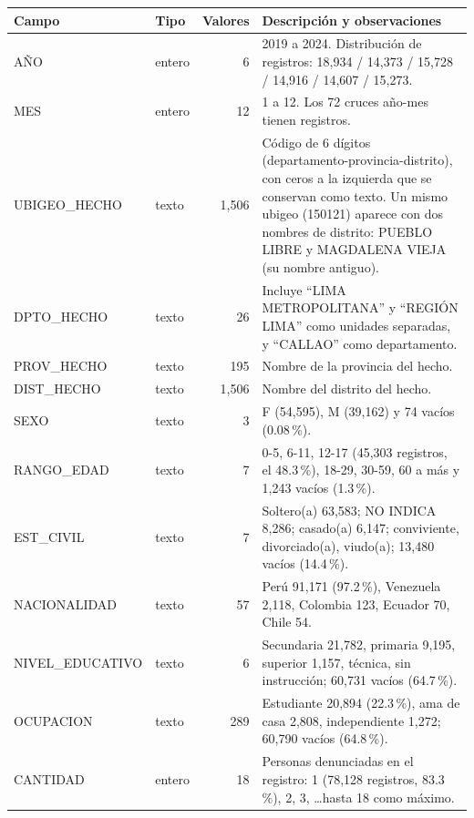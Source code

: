 \begin{center}
\small
\begin{tabular}{llrp{6.6cm}}
\toprule
\textbf{Campo} & \textbf{Tipo} & \textbf{Valores} & \textbf{Descripci\'on y observaciones}\\
\midrule
A\~NO & entero & 6 & 2019 a 2024. Distribuci\'on de registros: 18,934 / 14,373 / 15,728 / 14,916 / 14,607 / 15,273.\\
MES & entero & 12 & 1 a 12. Los 72 cruces a\~no-mes tienen registros.\\
UBIGEO\_HECHO & texto & 1,506 & C\'odigo de 6 d\'igitos (departamento-provincia-distrito), con ceros a la izquierda que se conservan como texto. Un mismo ubigeo (150121) aparece con dos nombres de distrito: PUEBLO LIBRE y MAGDALENA VIEJA (su nombre antiguo).\\
DPTO\_HECHO & texto & 26 & Incluye ``LIMA METROPOLITANA'' y ``REGI\'ON LIMA'' como unidades separadas, y ``CALLAO'' como departamento.\\
PROV\_HECHO & texto & 195 & Nombre de la provincia del hecho.\\
DIST\_HECHO & texto & 1,506 & Nombre del distrito del hecho.\\
SEXO & texto & 3 & F (54,595), M (39,162) y 74 vac\'ios (0.08\,\%).\\
RANGO\_EDAD & texto & 7 & 0-5, 6-11, 12-17 (45,303 registros, el 48.3\,\%), 18-29, 30-59, 60 a m\'as y 1,243 vac\'ios (1.3\,\%).\\
EST\_CIVIL & texto & 7 & Soltero(a) 63,583; NO INDICA 8,286; casado(a) 6,147; conviviente, divorciado(a), viudo(a); 13,480 vac\'ios (14.4\,\%).\\
NACIONALIDAD & texto & 57 & Per\'u 91,171 (97.2\,\%), Venezuela 2,118, Colombia 123, Ecuador 70, Chile 54.\\
NIVEL\_EDUCATIVO & texto & 6 & Secundaria 21,782, primaria 9,195, superior 1,157, t\'ecnica, sin instrucci\'on; 60,731 vac\'ios (64.7\,\%).\\
OCUPACION & texto & 289 & Estudiante 20,894 (22.3\,\%), ama de casa 2,808, independiente 1,272; 60,790 vac\'ios (64.8\,\%).\\
CANTIDAD & entero & 18 & Personas denunciadas en el registro: 1 (78,128 registros, 83.3\,\%), 2, 3, \dots hasta 18 como m\'aximo.\\
\bottomrule
\end{tabular}
\end{center}

